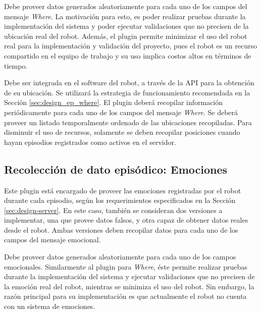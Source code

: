 Debe proveer datos generados aleatoriamente para cada uno de los campos del mensaje \textit{Where}. La motivación para esto, es poder realizar pruebas durante la implementación del sistema y poder ejecutar validaciones que no precisen de la ubicación real del robot. Además, el plugin permite minimizar el uso del robot real para la implementación y validación del proyecto, pues el robot es un recurso compartido en el equipo de trabajo y su uso implica costos altos en términos de tiempo.

Debe ser integrada en el software del robot, a través de la API para la obtención de su ubicación. Se utilizará la estrategia de funcionamiento recomendada en la Sección \ref{sec:design_ep_where}. El plugin deberá recopilar información periódicamente para cada uno de los campos del mensaje \textit{Where}. Se deberá proveer un listado temporalmente ordenado de las ubicaciones recopiladas. Para disminuir el uso de recursos, solamente se deben recopilar posiciones cuando hayan episodios registrados como activos en el servidor.


\subsection{Recolección de dato episódico: Emociones}

Este plugin está encargado de proveer las emociones registradas por el robot durante cada episodio, según los requerimientos especificados en la Sección \ref{sec:design-server}. En este caso, también se consideran dos versiones a implementar, una que provee datos falsos, y otra capaz de obtener datos reales desde el robot. Ambas versiones deben recopilar datos para cada uno de los campos del mensaje emocional.

Debe proveer datos generados aleatoriamente para cada uno de los campos emocionales. Similarmente al plugin para \textit{Where}, éste permite realizar pruebas durante la implementación del sistema y ejecutar validaciones que no precisen de la emoción real del robot, mientras se minimiza el uso del robot. Sin embargo, la razón principal para su implementación es que actualmente el robot no cuenta con un sistema de emociones.

